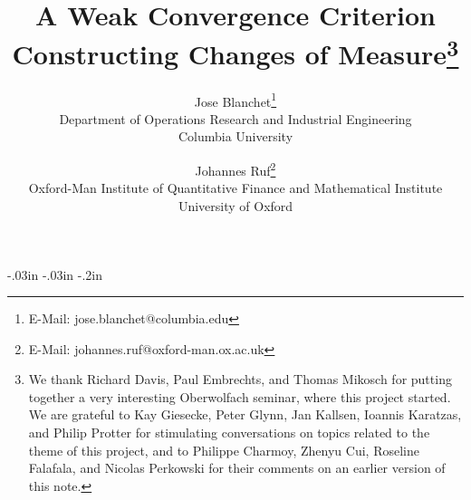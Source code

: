 \def\CTeXPreproc{Created by ctex v0.2.12, don't edit!}
\newtheorem{theorem}{Theorem}
\newtheorem{acknowledgement}[theorem]{Acknowledgement}
\newtheorem{algorithm}[theorem]{Algorithm}
\newtheorem{assumption}{Assumption}
\newtheorem{case}[theorem]{Case}
\newtheorem{claim}[theorem]{Claim}
\newtheorem{conclusion}[theorem]{Conclusion}
\newtheorem{condition}[theorem]{Condition}
\newtheorem{conjecture}[theorem]{Conjecture}
\newtheorem{corollary}{Corollary}
\newtheorem{criterion}[theorem]{Criterion}
\newtheorem{example}[theorem]{Example}
\newtheorem{lemma}{Lemma}
\newtheorem{notation}[theorem]{Notational Convention}
\newtheorem{proposition}{Proposition}
\newtheorem{remark}{Remark}
\theoremstyle{remark}
\newtheorem{ex}{Example}
\theoremstyle{remark}
\newtheorem{definition}{Definition}
\newcommand{\ink}{\rule{.5\baselineskip}{.55\baselineskip}}
\newcommand{\ve}{{\varepsilon}}
\newcommand{\E}{{\mathbb{E}}}
\newcommand{\e}{{\mathbf{e}}}
\newcommand{\R}{{\mathbb{R}}}
\newcommand{\Z}{{\mathbb{Z}}}
\newcommand{\HH}{{\mathbb{H}}}
\newcommand{\Prob}{{\mathbb{P}}}
\newcommand{\Q}{{\mathbb{Q}}}
\newcommand{\V}{{\mathbb{V}}}
\newcommand{\ones}{{\mathbf{1}}}
\newcommand{\interior}{{\partial_{\emptyset}}}
\newcommand{\lam}{{\lambda}}
\newcommand{\cR}{\mathcal{R}}
\newcommand{\I}{\mathcal{I}}
\newcommand{\1}{\mathbf{1}}
\newcommand{\F}{\mathcal{F}}
\newcommand{\N}{\mathbb{N}}
\renewcommand{\L}{\mathcal{L}}
\newcommand{\G}{\mathcal{G}}
\newcommand{\tr}{^\mathsf{T}}
\newcommand{\ess}{\mathrm{ess }}
\newcommand{\dd}{\mathrm{d}}
\textwidth 6.52in \oddsidemargin -.03in \evensidemargin -.03in
\textheight 8.8in \topmargin -.2in \pagestyle{myheadings}

%



\title{A Weak Convergence Criterion Constructing Changes of Measure\thanks{%
We thank Richard Davis, Paul Embrechts, and Thomas Mikosch for putting
together a very interesting Oberwolfach seminar, where this project started.
We are grateful to Kay Giesecke, Peter Glynn, Jan Kallsen, Ioannis Karatzas,
and Philip Protter for stimulating conversations on topics related to the
theme of this project, and to Philippe Charmoy, Zhenyu Cui, Roseline
Falafala, and Nicolas Perkowski for their comments on an earlier version of
this note.}}
\author{Jose Blanchet\thanks{%
E-Mail: jose.blanchet@columbia.edu} \\
Department of Operations Research and Industrial Engineering\\
Columbia University \and Johannes Ruf\thanks{%
E-Mail: johannes.ruf@oxford-man.ox.ac.uk} \\
Oxford-Man Institute of Quantitative Finance and Mathematical Institute\\
University of Oxford}
\maketitle

